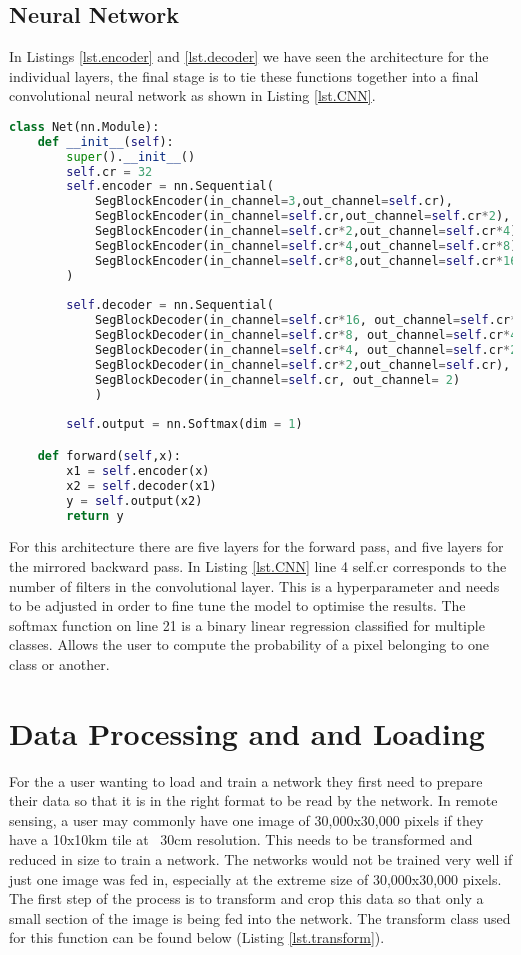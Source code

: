 \subsection{Neural Network}\label{sub.CNN}
In Listings \ref{lst.encoder} and \ref{lst.decoder} we have seen the architecture for the individual layers, the final stage is to tie these functions together into a final convolutional neural network as shown in Listing \ref{lst.CNN}.
\begin{lstlisting}[language=Python, caption = Fully connected Convolutional Neural Network, label={lst.CNN}]
class Net(nn.Module):
    def __init__(self):
        super().__init__()
        self.cr = 32
        self.encoder = nn.Sequential(
            SegBlockEncoder(in_channel=3,out_channel=self.cr),
            SegBlockEncoder(in_channel=self.cr,out_channel=self.cr*2),
            SegBlockEncoder(in_channel=self.cr*2,out_channel=self.cr*4),
            SegBlockEncoder(in_channel=self.cr*4,out_channel=self.cr*8),
            SegBlockEncoder(in_channel=self.cr*8,out_channel=self.cr*16)
        )
        
        self.decoder = nn.Sequential(
            SegBlockDecoder(in_channel=self.cr*16, out_channel=self.cr*8),
            SegBlockDecoder(in_channel=self.cr*8, out_channel=self.cr*4),
            SegBlockDecoder(in_channel=self.cr*4, out_channel=self.cr*2),
            SegBlockDecoder(in_channel=self.cr*2,out_channel=self.cr),
            SegBlockDecoder(in_channel=self.cr, out_channel= 2)
            )
        
        self.output = nn.Softmax(dim = 1)

    def forward(self,x):
        x1 = self.encoder(x)
        x2 = self.decoder(x1)
        y = self.output(x2)
        return y
\end{lstlisting}
For this architecture there are five layers for the forward pass, and five layers for the mirrored backward pass. In Listing \ref{lst.CNN} line 4 self.cr corresponds to the number of filters in the convolutional layer. This is a hyperparameter and needs to be adjusted in order to fine tune the model to optimise the results. The softmax function on line 21 is a binary linear regression classified for multiple classes. Allows the user to compute the probability of a pixel belonging to one class or another.


\section{Data Processing and and Loading}
For the a user wanting to load and train a network they first need to prepare their data so that it is in the right format to be read by the network. In remote sensing, a user may commonly have one image of 30,000x30,000 pixels if they have a 10x10km tile at ~30cm resolution. This needs to be transformed and reduced in size to train a network. The networks would not be trained very well if just one image was fed in, especially at the extreme size of 30,000x30,000 pixels. The first step of the process is to transform and crop this data so that only a small section of the image is being fed into the network. The transform class used for this function can be found below (Listing \ref{lst.transform}).
